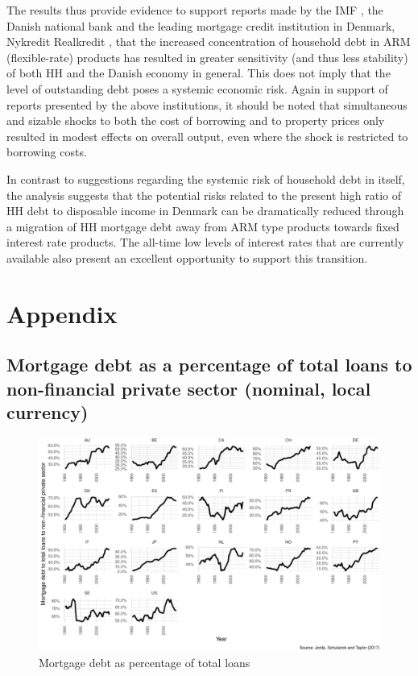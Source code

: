 \documentclass[
]{book}
\begin{document}
The results thus provide evidence to support reports made by the IMF \citep{sheehy2014}, the Danish national bank \citep{DanmarksNationalbank2016a} and the leading mortgage credit institution in Denmark, Nykredit Realkredit \citep{Skinhoj2019}, that the increased concentration of household debt in ARM (flexible-rate) products has resulted in greater sensitivity (and thus less stability) of both HH and the Danish economy in general. This does not imply that the level of outstanding debt poses a systemic economic risk. Again in support of reports presented by the above institutions, it should be noted that simultaneous and sizable shocks to both the cost of borrowing and to property prices only resulted in modest effects on overall output, even where the shock is restricted to borrowing costs.

In contrast to suggestions regarding the systemic risk of household debt in itself, the analysis suggests that the potential risks related to the present high ratio of HH debt to disposable income in Denmark can be dramatically reduced through a migration of HH mortgage debt away from ARM type products towards fixed interest rate products. The all-time low levels of interest rates that are currently available also present an excellent opportunity to support this transition.

\hypertarget{sec:Appendix}{%
\section{Appendix}\label{sec:Appendix}}

\hypertarget{sec:fi-fl-sfc-Ap-A-MtoL}{%
\subsection{Mortgage debt as a percentage of total loans to non-financial private sector (nominal, local currency)}\label{sec:fi-fl-sfc-Ap-A-MtoL}}

\begin{figure}
\centering
\includegraphics{figures/fl-fi-sfc-lt-debt-1.pdf}
\caption{\label{fig:fl-fi-sfc-lt-debt}Mortgage debt as percentage of total loans}
\end{figure}
\end{document}
